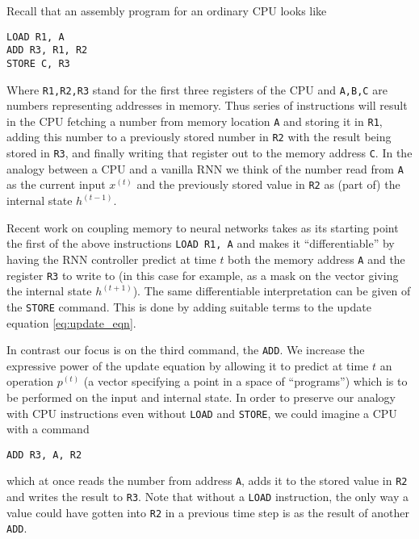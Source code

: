 \documentclass[english,letter paper,12pt,leqno]{article}
\theoremstyle{example}
\newtheorem{remark}[theorem]{Remark}
\numberwithin{equation}{section}
\begin{document}
Recall that an assembly program for an ordinary CPU looks like
\begin{verbatim}
LOAD R1, A
ADD R3, R1, R2
STORE C, R3
\end{verbatim}
Where \verb+R1,R2,R3+ stand for the first three registers of the CPU and \verb+A,B,C+ are numbers representing addresses in memory. Thus series of instructions will result in the CPU fetching a number from memory location \verb+A+ and storing it in \verb+R1+, adding this number to a previously stored number in \verb+R2+ with the result being stored in \verb+R3+, and finally writing that register out to the memory address \verb+C+. In the analogy between a CPU and a vanilla RNN we think of the number read from \verb+A+ as the current input $x^{(t)}$ and the previously stored value in \verb+R2+ as (part of) the internal state $h^{(t-1)}$.

Recent work \cite{??,??} on coupling memory to neural networks takes as its starting point the first of the above instructions \verb+LOAD R1, A+ and makes it ``differentiable'' by having the RNN controller predict at time $t$ both the memory address \verb+A+ and the register \verb+R3+ to write to (in this case for example, as a mask on the vector giving the internal state $h^{(t+1)}$). The same differentiable interpretation can be given of the \verb+STORE+ command. This is done by adding suitable terms to the update equation \eqref{eq:update_eqn}.

In contrast our focus is on the third command, the \verb+ADD+. We increase the expressive power of the update equation by allowing it to predict at time $t$ an operation $p^{(t)}$ (a vector specifying a point in a space of ``programs'') which is to be performed on the input and internal state. In order to preserve our analogy with CPU instructions even without \verb+LOAD+ and \verb+STORE+, we could imagine a CPU with a command
\begin{verbatim}
ADD R3, A, R2
\end{verbatim}
which at once reads the number from address \verb+A+, adds it to the stored value in \verb+R2+ and writes the result to \verb+R3+. Note that without a \verb+LOAD+ instruction, the only way a value could have gotten into \verb+R2+ in a previous time step is as the result of another \verb+ADD+.

\end{document}
